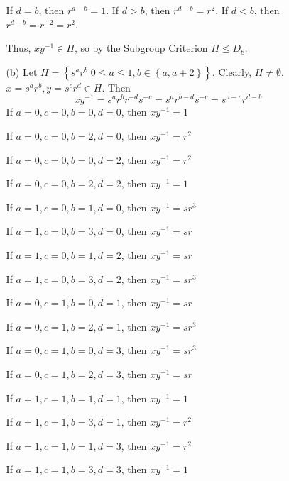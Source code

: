 \documentclass[12pt]{article}
\begin{document}
\begin{itemize}
\begin{itemize}
If $d = b$, then $r^{d-b} = 1$. If $d > b$, then $r^{d - b} = r^2$. If $d < b$, then $r^{d - b} = r^{-2} = r^2$.

Thus, $xy^{-1} \in H$, so by the Subgroup Criterion $H \leq D_8$.
\item[(b)]
Let $H = \left\lbrace s^ar^b | 0 \leq a \leq 1, b \in \left\lbrace a, a + 2 \right\rbrace \right\rbrace$. Clearly, $H \neq \emptyset$. $x = s^ar^b, y = s^cr^d \in H$. Then
$$xy^{-1} = s^ar^br^{-d}s^{-c} = s^ar^{b - d}s^{-c} = s^{a-c}r^{d-b}$$
If $a = 0, c = 0, b = 0, d = 0$, then $xy^{-1} = 1$

If $a = 0, c = 0, b = 2, d = 0$, then $xy^{-1} = r^2$

If $a = 0, c = 0, b = 0, d = 2$, then $xy^{-1} = r^2$

If $a = 0, c = 0, b = 2, d = 2$, then $xy^{-1} = 1$

If $a = 1, c = 0, b = 1, d = 0$, then $xy^{-1} = sr^3$

If $a = 1, c = 0, b = 3, d = 0$, then $xy^{-1} = sr$

If $a = 1, c = 0, b = 1, d = 2$, then $xy^{-1} = sr$

If $a = 1, c = 0, b = 3, d = 2$, then $xy^{-1} = sr^3$

If $a = 0, c = 1, b = 0, d = 1$, then $xy^{-1} = sr$

If $a = 0, c = 1, b = 2, d = 1$, then $xy^{-1} = sr^3$

If $a = 0, c = 1, b = 0, d = 3$, then $xy^{-1} = sr^3$

If $a = 0, c = 1, b = 2, d = 3$, then $xy^{-1} = sr$

If $a = 1, c = 1, b = 1, d = 1$, then $xy^{-1} = 1$

If $a = 1, c = 1, b = 3, d = 1$, then $xy^{-1} = r^2$

If $a = 1, c = 1, b = 1, d = 3$, then $xy^{-1} = r^2$

If $a = 1, c = 1, b = 3, d = 3$, then $xy^{-1} = 1$



\end{itemize}
\end{itemize}
\end{document}
